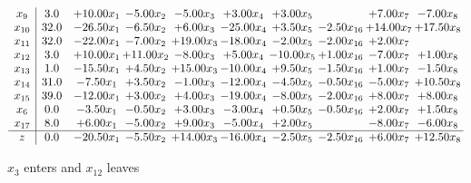 \documentclass[9pt]{article}
\begin{document}
 \[\begin{array}{c| c c@{\hskip 2pt} c@{\hskip 2pt} c@{\hskip 2pt} c@{\hskip 2pt} c@{\hskip 2pt} c@{\hskip 2pt} c@{\hskip 2pt} c@{\hskip 2pt} }
 x_{9}   &  3.0 & + 10.00 x_{1} & -5.00 x_{2} & -5.00 x_{3} & +  3.00 x_{4} & +  3.00 x_{5} &   & +  7.00 x_{7} & -7.00 x_{8}\\
 x_{10}   &  32.0 & -26.50 x_{1} & -6.50 x_{2} & +  6.00 x_{3} & -25.00 x_{4} & +  3.50 x_{5} & -2.50 x_{16} & + 14.00 x_{7} & + 17.50 x_{8}\\
 x_{11}   &  32.0 & -22.00 x_{1} & -7.00 x_{2} & + 19.00 x_{3} & -18.00 x_{4} & -2.00 x_{5} & -2.00 x_{16} & +  2.00 x_{7} &   \\
 x_{12}   &  3.0 & + 10.00 x_{1} & + 11.00 x_{2} & -8.00 x_{3} & +  5.00 x_{4} & -10.00 x_{5} & +  1.00 x_{16} & -7.00 x_{7} & +  1.00 x_{8}\\
 x_{13}   &  1.0 & -15.50 x_{1} & +  4.50 x_{2} & + 15.00 x_{3} & -10.00 x_{4} & +  9.50 x_{5} & -1.50 x_{16} & +  1.00 x_{7} & -1.50 x_{8}\\
 x_{14}   &  31.0 & -7.50 x_{1} & +  3.50 x_{2} & -1.00 x_{3} & -12.00 x_{4} & -4.50 x_{5} & -0.50 x_{16} & -5.00 x_{7} & + 10.50 x_{8}\\
 x_{15}   &  39.0 & -12.00 x_{1} & +  3.00 x_{2} & +  4.00 x_{3} & -19.00 x_{4} & -8.00 x_{5} & -2.00 x_{16} & +  8.00 x_{7} & +  8.00 x_{8}\\
 x_{6}   &  0.0 & -3.50 x_{1} & -0.50 x_{2} & +  3.00 x_{3} & -3.00 x_{4} & +  0.50 x_{5} & -0.50 x_{16} & +  2.00 x_{7} & +  1.50 x_{8}\\
 x_{17}   &  8.0 & +  6.00 x_{1} & -5.00 x_{2} & +  9.00 x_{3} & -5.00 x_{4} & +  2.00 x_{5} &   & -8.00 x_{7} & -6.00 x_{8}\\
\hline
z    &  0.0 & -20.50 x_{1} & -5.50 x_{2} & + 14.00 x_{3} & -16.00 x_{4} & -2.50 x_{5} & -2.50 x_{16} & +  6.00 x_{7} & + 12.50 x_{8}\\
\end{array}\]


 $ x_{3} $ enters and $ x_{12} $ leaves 
\end{document}
